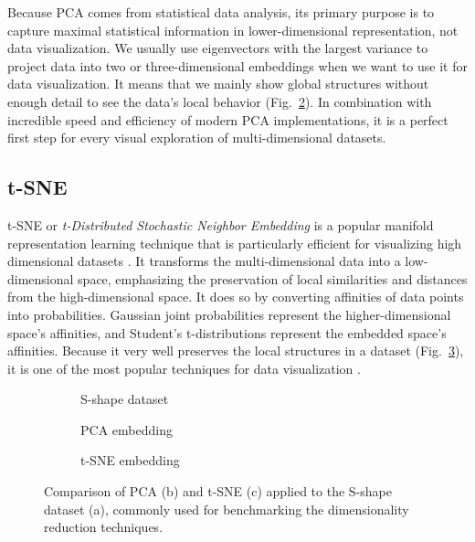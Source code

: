 Because PCA comes from statistical data analysis, its primary purpose is to capture maximal statistical information in lower-dimensional representation, not data visualization. We usually use eigenvectors with the largest variance to project data into two or three-dimensional embeddings when we want to use it for data visualization. It means that we mainly show global structures without enough detail to see the data's local behavior (Fig.~\ref{fig:pca-emb}). In combination with incredible speed and efficiency of modern PCA implementations, it is a perfect first step for every visual exploration of multi-dimensional datasets.

\subsection{t-SNE}
t-SNE or \textit{t-Distributed Stochastic Neighbor Embedding} \cite{vis:tsne} is a popular manifold representation learning technique that is particularly efficient for visualizing high dimensional datasets \cite{vis:repre-learning}. It transforms the multi-dimensional data into a low-dimensional space, emphasizing the preservation of local similarities and distances from the high-dimensional space. It does so by converting affinities of data points into probabilities. Gaussian joint probabilities represent the higher-dimensional space's affinities, and Student's t-distributions represent the embedded space's affinities. Because it very well preserves the local structures in a dataset (Fig.~\ref{fig:tsne}), it is one of the most popular techniques for data visualization \cite{vis:tsne-analysis}.
\begin{figure}[h]
    \centering
    \begin{subfigure}[b]{0.33\textwidth}
        \centering
        
        \caption{S-shape dataset}
        \label{fig:s-shape-sub}
    \end{subfigure}
    \begin{subfigure}[b]{0.3\textwidth}
        \centering
        
        \caption{PCA embedding}
        \label{fig:pca-emb}
    \end{subfigure}
    \begin{subfigure}[b]{0.3\textwidth}
        \centering
        
        \caption{t-SNE embedding}
        \label{fig:tsne}
    \end{subfigure}
    
    \caption{Comparison of PCA (b) and t-SNE (c) applied to the S-shape dataset (a), commonly used for benchmarking the dimensionality reduction techniques.}
    \label{fig:s-shape}
\end{figure}

